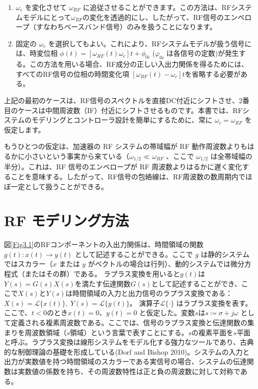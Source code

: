 \documentclass[book]{jlreq}
\begin{document}
\begin{enumerate}
    \item $\omega_c$ を変化させて $\omega_{RF}$ に追従させることができます。この方法は、RFシステムモデルにとって$\omega_{RF}$の変化を透過的にし、したがって、RF信号のエンベロープ（すなわちベースバンド信号）のみを扱うことになります。
    \item 固定の $\omega_c$ を選択してもよい。これにより、RFシステムモデルが扱う信号には、時変位相 $\phi (t) = [\omega_{RF} (t)\omega_{c}]t + \phi_{0i}$ ($\varphi_{0i}$ は各信号の定数)が発生する。この方法を用いる場合、RF成分の正しい入出力関係を得るためには、すべてのRF信号の位相の時間変化項 $[\omega_{RF}(t) - \omega_{c}]t$を省略する必要がある。
\end{enumerate}

上記の最初のケースは、RF信号のスペクトルを直接DC付近にシフトさせ、2番目のケースは中間周波数（IF）付近にシフトさせるものです。本書では、RFシステムのモデリングとコントローラ設計を簡単にするために、常に $\omega_c = \omega_{RF}$ を仮定します。

もうひとつの仮定は、加速器の RF システムの帯域幅が RF 動作周波数よりもはるかに小さいという事実から来ている（$\omega_{1/2} \ll \omega_{RF}$ 、ここで $\omega_{1/2}$ は全帯域幅の半分）。これは、RF 信号のエンベロープが RF 周波数よりはるかに遅く変化することを意味する。したがって、RF信号の包絡線は、RF周波数の数周期内でほぼ一定として扱うことができる。

\section{RF モデリング方法}

図\ref{Fig3.1}のRFコンポーネントの入出力関係は、時間領域の関数 $g(t) : x(t) \rightarrow y(t)$ として記述することができる。ここで $g$ は静的システムではスカラー（$x$ または $y$ がベクトルの場合は行列）、動的システムでは微分方程式（またはその群）である。
ラプラス変換を用いると$g(t)$は$Y(s) = G(s)X(s)$を満たす伝達関数$G(s)$として記述することができ、ここで$X(s)$と$Y(s)$は時間領域の入力と出力信号のラプラス変換である：$X(s) = \mathcal{L}\{x(t)\},\; Y(s) = \mathcal{L}\{y(t)\}$。
演算子$\mathcal{L}\{\cdot\}$ はラプラス変換を表す。ここで、$t<0$のとき$x(t) = 0$、$y(t) = 0$ と仮定した。変数$s$は$s \coloneqq \sigma + j\omega$ として定義される複素周波数である。ここでは、信号のラプラス変換と伝達関数の集まりを周波数領域（$s$領域）という言葉で表すことにする。$s$の複素平面を$s$平面と呼ぶ。ラプラス変換は線形システムをモデル化する強力なツールであり、古典的な制御理論の基礎を形成している(Dorf and Bishop 2010)。システムの入力と出力が実数値を持つ時間領域のスカラーである実信号の場合、システムの伝達関数は実数値の係数を持ち、その周波数特性は正と負の周波数に対して対称である。
\end{document}
